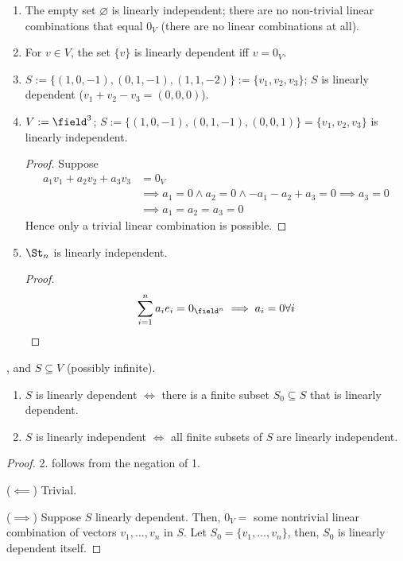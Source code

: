 \begin{example}
    \begin{enumerate}
        \item The empty set $\varnothing$ is linearly independent; there are no non-trivial linear combinations that equal $0_V$ (there are no linear combinations at all).
        \item For $v \in V$, the set $\{v\}$ is linearly dependent iff $v = 0_V$.
        \item $S := \{(1,0,-1), (0,1,-1), (1,1,-2)\} := \{v_1, v_2, v_3\}$; $S$ is linearly dependent ($v_1 + v_2 - v_3 = (0,0,0)$).
        \item $V := \field^3$; $S := \{(1,0,-1), (0,1,-1), (0,0,1)\} = \{v_1, v_2, v_3\}$ is linearly independent.
        \begin{proof}
            Suppose
            \begin{align*}
                a_1v_1 + a_2 v_2 + a_3 v_3 &= 0_V\\
                &\implies a_1 = 0 \wedge a_2 = 0 \wedge -a_1 - a_2 + a_3 = 0 \implies a_3 = 0\\
                &\implies a_1 = a_2 = a_3 = 0
            \end{align*}
            Hence only a trivial linear combination is possible.
        \end{proof}
        \item $\St_n$ is linearly independent.
        \begin{proof}
            \begin{align*}
                \sum_{i=1}^n a_i e_i = 0_{\field^n} \implies a_i = 0 \forall i
            \end{align*}
        \end{proof}
    \end{enumerate}
\end{example}

\begin{lemma}
     , and $S \subseteq V$ (possibly infinite). \begin{enumerate}
        \item $S$ is linearly dependent $\iff$ there is a finite subset $S_0 \subseteq S$ that is linearly dependent.
        \item $S$ is linearly independent $\iff$ all finite subsets of $S$ are linearly independent.
    \end{enumerate}
\end{lemma}

\begin{proof}
    2. follows from the negation of 1.

    \noindent($\impliedby$) Trivial.

    \noindent($\implies$) Suppose $S$ linearly dependent. Then, $0_V = $ some nontrivial linear combination of vectors $v_1, \dots, v_n$ in $S$. Let $S_0 = \{v_1, \dots, v_n\}$, then, $S_0$ is linearly dependent itself.
\end{proof}

